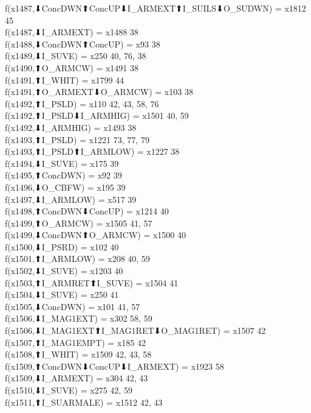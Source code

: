f(x1487,⬇ConcDWN⬆ConcUP⬇I_ARMEXT⬆I_SUILS⬇O_SUDWN) = x1812 {45} \\
f(x1487,⬇I_ARMEXT) = x1488 {38} \\
f(x1488,⬇ConcDWN⬆ConcUP) = x93 {38} \\
f(x1489,⬇I_SUVE) = x250 {40, 76, 38} \\
f(x1490,⬆O_ARMCW) = x1491 {38} \\
f(x1491,⬆I_WHIT) = x1799 {44} \\
f(x1491,⬆O_ARMEXT⬇O_ARMCW) = x103 {38} \\
f(x1492,⬆I_PSLD) = x110 {42, 43, 58, 76} \\
f(x1492,⬆I_PSLD⬇I_ARMHIG) = x1501 {40, 59} \\
f(x1492,⬇I_ARMHIG) = x1493 {38} \\
f(x1493,⬆I_PSLD) = x1221 {73, 77, 79} \\
f(x1493,⬆I_PSLD⬆I_ARMLOW) = x1227 {38} \\
f(x1494,⬇I_SUVE) = x175 {39} \\
f(x1495,⬆ConcDWN) = x92 {39} \\
f(x1496,⬇O_CBFW) = x195 {39} \\
f(x1497,⬇I_ARMLOW) = x517 {39} \\
f(x1498,⬆ConcDWN⬇ConcUP) = x1214 {40} \\
f(x1499,⬆O_ARMCW) = x1505 {41, 57} \\
f(x1499,⬇ConcDWN⬆O_ARMCW) = x1500 {40} \\
f(x1500,⬇I_PSRD) = x102 {40} \\
f(x1501,⬆I_ARMLOW) = x208 {40, 59} \\
f(x1502,⬇I_SUVE) = x1203 {40} \\
f(x1503,⬆I_ARMRET⬆I_SUVE) = x1504 {41} \\
f(x1504,⬇I_SUVE) = x250 {41} \\
f(x1505,⬇ConcDWN) = x101 {41, 57} \\
f(x1506,⬇I_MAG1EXT) = x302 {58, 59} \\
f(x1506,⬇I_MAG1EXT⬆I_MAG1RET⬇O_MAG1RET) = x1507 {42} \\
f(x1507,⬆I_MAG1EMPT) = x185 {42} \\
f(x1508,⬆I_WHIT) = x1509 {42, 43, 58} \\
f(x1509,⬆ConcDWN⬇ConcUP⬇I_ARMEXT) = x1923 {58} \\
f(x1509,⬇I_ARMEXT) = x304 {42, 43} \\
f(x1510,⬇I_SUVE) = x275 {42, 59} \\
f(x1511,⬆I_SUARMALE) = x1512 {42, 43} \\
